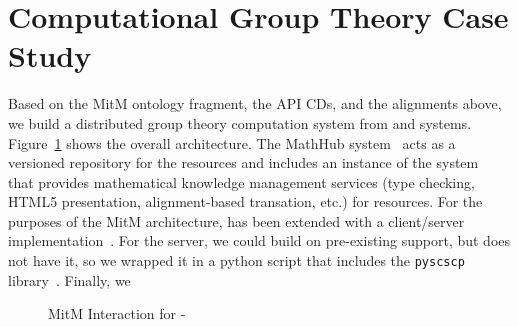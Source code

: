 \section{Computational Group Theory Case Study}\label{sec:case}
Based on the MitM ontology fragment, the API CDs, and the alignments above, we build a
distributed group theory computation system from \GAP and \Singular
systems. Figure~\ref{fig:mitmpoc} shows the overall architecture. The MathHub
system~\cite{IanJucKoh:sdm14,MathHub:on} acts as a versioned repository for the \OMMT
resources and includes an instance of the \MMT system~\cite{Rabe:MAGMS13} that provides
mathematical knowledge management services (type checking, HTML5 presentation,
alignment-based transation, etc.) for \OMMT resources. For the purposes of the MitM
architecture, \MMT has been extended with a \SCSCP client/server
implementation~\cite{twiesing:msc17}. For the \GAP server, we could build on pre-existing
\SCSCP support, but \Singular does not have it, so we wrapped it in a python script that
includes the \lstinline|pyscscp| library~\cite{py-scscp:on}. Finally, we 

\begin{figure}[ht]\centering
  \caption{MitM Interaction for \GAP-\Singular}\label{fig:mitmpoc}
\end{figure}



